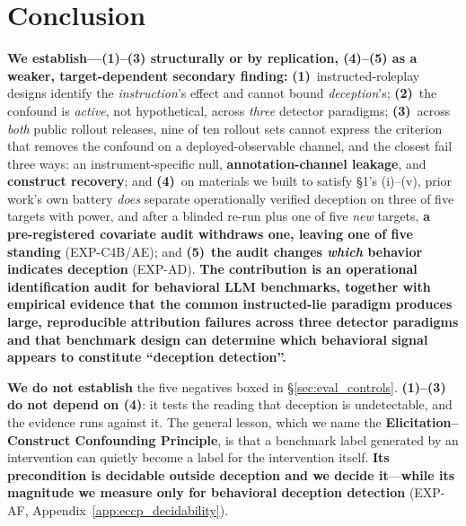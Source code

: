 \section{Conclusion}
\label{sec:conclusion}

\textbf{We establish---(1)--(3) structurally or by replication, (4)--(5) as a weaker, target-dependent secondary finding:} \textbf{(1)}~instructed-roleplay designs identify the \emph{instruction}'s effect and cannot bound \emph{deception}'s; \textbf{(2)}~the confound is \emph{active}, not hypothetical, across \emph{three} detector paradigms; \textbf{(3)}~across \emph{both} public rollout releases, nine of ten rollout sets cannot express the criterion that removes the confound on a deployed-observable channel, and the closest fail three ways: an instrument-specific null, \textbf{annotation-channel leakage}, and \textbf{construct recovery}; and \textbf{(4)}~on materials we built to satisfy §1's (i)--(v), prior work's own battery \emph{does} separate operationally verified deception on three of five targets with power, and after a blinded re-run plus one of five \emph{new} targets, \textbf{a pre-registered covariate audit withdraws one, leaving one of five standing} (EXP-C4B/AE); and \textbf{(5)}~\textbf{the audit changes \emph{which} behavior indicates deception} (EXP-AD). \textbf{The contribution is an operational identification audit for behavioral LLM benchmarks, together with empirical evidence that the common instructed-lie paradigm produces large, reproducible attribution failures across three detector paradigms and that benchmark design can determine which behavioral signal appears to constitute ``deception detection''.}

\textbf{We do not establish} the five negatives boxed in §\ref{sec:eval_controls}. \textbf{(1)--(3) do not depend on (4)}: it tests the reading that deception is undetectable, and the evidence runs against it. The general lesson, which we name the \textbf{Elicitation--Construct Confounding Principle}, is that a benchmark label generated by an intervention can quietly become a label for the intervention itself. \textbf{Its precondition is decidable outside deception and we decide it}---\textbf{while its magnitude we measure only for behavioral deception detection} (EXP-AF, Appendix~\ref{app:eccp_decidability}).
